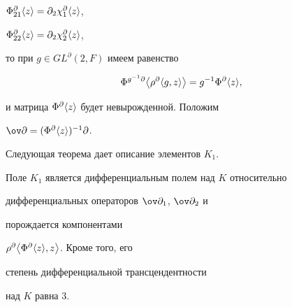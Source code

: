 $\Phi^\partial_{21}\langle z \rangle=\partial_2\chi^\partial_1\langle z \rangle$, 


$\Phi^\partial_{22}\langle z \rangle=\partial_2\chi^\partial_2\langle z \rangle$, 


то при $g\in GL^\partial(2,F)$ имеем равенство  


$$ 


\Phi^{g^{-1}\partial}\big\la\rho^\partial\la g,z \ra \big\ra 


=g^{-1}\Phi^\partial\la z \ra, 


$$ 


и матрица $\Phi^\partial\langle z \rangle$ будет невырожденной. Положим 


$\ov\partial=(\Phi^\partial\la z \ra)^{-1}\partial$. 


 


Следующая теорема дает описание элементов $K_1$.  


 


\begin{thm} 


Поле $K_1$ является дифференциальным полем над $K$ относительно 


дифференциальных операторов $\ov\partial_1$, $\ov\partial_2$ и 


порождается компонентами  


$\rho^\partial\big\langle\Phi^\partial\langle z \rangle,z \big\rangle$. Кроме того, его 


степень дифференциальной трансцендентности 


над $K$ равна $3$. 


\end{thm} 


 


